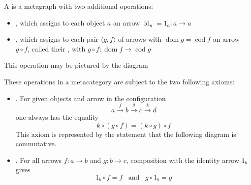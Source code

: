 \documentclass{mathnotes}
\DeclareMathOperator{\dom}{dom}
\DeclareMathOperator{\cod}{cod}
\DeclareMathOperator{\id}{id}
\begin{document}
\begin{defi}
    A  is a metagraph with two additional operations:
    \begin{itemize}
        \item {}, which assigns to each object $a$ an arrow
            $\id_a=1_a:a\rightarrow a$
        \item {}, which assigns to each pair $\langle g,f
            \rangle$ of arrows with $\dom g=\cod f$ an arrow $g\circ f$,
            called their , with $g\circ
            f:\dom f\rightarrow\cod g$
    \end{itemize}
    This operation may be pictured by the diagram
    \begin{center}
    \end{center}
    These operations in a metacategory are subject to the two following axioms:
    \begin{itemize}
        \item {}. For given objects and arrow in the
            configuration
            \[a\xrightarrow{f}b\xrightarrow{g}c\xrightarrow{k}d\]
            one always has the equality
            \[k\circ\left(g\circ f\right)=\left(k\circ g\right)\circ f\]
            This axiom is represented by the statement that the following
            diagram is commutative.
            \begin{center}
            \end{center}
        \item {}. For all arrows $f:a\rightarrow b$ and
            $g:b\rightarrow c$, composition with the identity arrow $1_b$ gives
            \[1_b\circ f=f\hspace{10pt}\text{and}\hspace{10pt}g\circ1_b=g\]

\end{itemize}
\end{defi}
\end{document}
